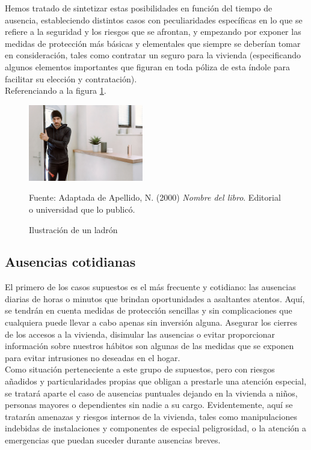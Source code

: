 Hemos tratado de sintetizar estas posibilidades en función del tiempo de ausencia, estableciendo distintos casos con peculiaridades específicas en lo que se refiere a la seguridad y los riesgos que se afrontan, y empezando por exponer las medidas de protección más básicas y elementales que siempre se deberían tomar en consideración, tales como contratar un seguro para la vivienda (especificando algunos elementos importantes que figuran en toda póliza de esta índole para facilitar su elección y contratación).\\

Referenciando a la figura \ref{fig:ejemplo}.
\begin{figure}[H]
    \begin{center}
        \includegraphics[width=5cm]{img/capitulo_3/intruso.jpg}
    \end{center}
    \caption{Ilustración de un ladrón}
    Fuente: Adaptada de Apellido, N. (2000) \textit{Nombre del libro}.
    Editorial o universidad que lo publicó.
    \label{fig:ejemplo}
\end{figure}

\subsection{Ausencias cotidianas}
El primero de los casos supuestos es el más frecuente y cotidiano: las ausencias diarias de horas o minutos que brindan oportunidades a asaltantes atentos. Aquí, se tendrán en cuenta medidas de protección sencillas y sin complicaciones que cualquiera puede llevar a cabo apenas sin inversión alguna. Asegurar los cierres de los accesos a la vivienda, disimular las ausencias o evitar proporcionar información sobre nuestros hábitos son algunas de las medidas que se exponen para evitar intrusiones no deseadas en el hogar.\\
 
Como situación perteneciente a este grupo de supuestos, pero con riesgos añadidos y particularidades propias que obligan a prestarle una atención especial, se tratará aparte el caso de ausencias puntuales dejando en la vivienda a niños, personas mayores o dependientes sin nadie a su cargo. Evidentemente, aquí se tratarán amenazas y riesgos internos de la vivienda, tales como manipulaciones indebidas de instalaciones y componentes de especial peligrosidad, o la atención a emergencias que puedan suceder durante ausencias breves.\\

